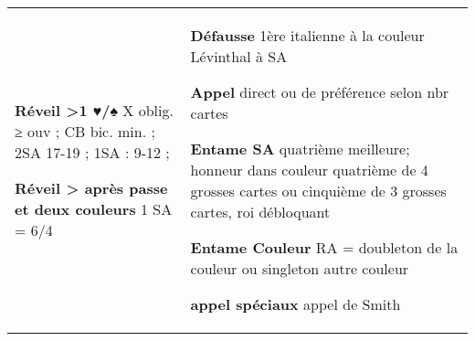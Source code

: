 \documentclass[twoside,a5paper]{article}
\newcommand{\g}[1]{\textbf{#1}}
\begin{document}
{\begin{tabular}{p{}|p{}}
	 
	  \g{Réveil >1 ♥/♠} \newline
	 X oblig. ≥ ouv  ; CB bic. min. ; 2SA 17-19 ; 1SA : 9-12   ; \newline


	\g{Réveil > après passe et deux couleurs}
	 1 SA = 6/4	
	 
	
	  						 
	 
	  &%
	 
	  \g{Défausse} \newline
	  1ère italienne à la couleur 
	  Lévinthal à SA\newline
	  
	  
	  \g{Appel} \newline
	 direct ou de préférence selon nbr cartes\newline
	 \
	 
	 
	 \g{Entame SA} \newline
	quatrième meilleure; honneur dans couleur quatrième de 4 grosses cartes ou cinquième de 3 grosses cartes, roi débloquant\newline


	\g{Entame Couleur} \newline
	RA = doubleton de la couleur ou singleton autre couleur\newline


	\g{appel spéciaux} \newline
	appel de Smith

	\end{tabular}							%

}
\end{document}

